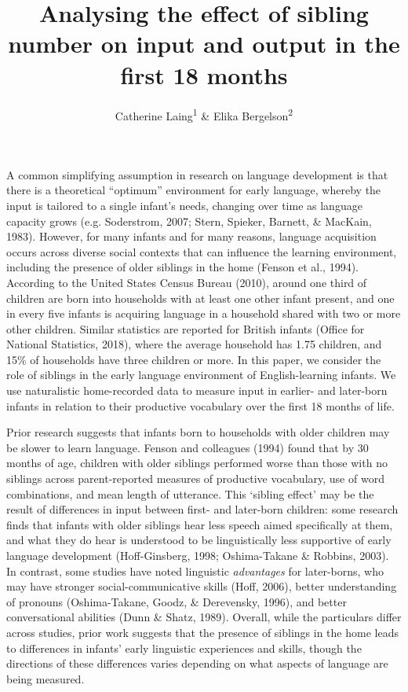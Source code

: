\documentclass[
  english,
  man,floatsintext]{apa6}
\title{Analysing the effect of sibling number on input and output in the first 18 months}
\author{Catherine Laing\textsuperscript{1} \& Elika Bergelson\textsuperscript{2}}
\date{}
\affiliation{\vspace{0.5cm}\textsuperscript{1} University of York, York, UK\\\textsuperscript{2} Duke University, Durham, NC, USA}
\begin{document}
\maketitle

A common simplifying assumption in research on language development is that there is a theoretical ``optimum'' environment for early language, whereby the input is tailored to a single infant's needs, changing over time as language capacity grows (e.g. Soderstrom, 2007; Stern, Spieker, Barnett, \& MacKain, 1983). However, for many infants and for many reasons, language acquisition occurs across diverse social contexts that can influence the learning environment, including the presence of older siblings in the home (Fenson et al., 1994). According to the United States Census Bureau (2010), around one third of children are born into households with at least one other infant present, and one in every five infants is acquiring language in a household shared with two or more other children. Similar statistics are reported for British infants (Office for National Statistics, 2018), where the average household has 1.75 children, and 15\% of households have three children or more. In this paper, we consider the role of siblings in the early language environment of English-learning infants. We use naturalistic home-recorded data to measure input in earlier- and later-born infants in relation to their productive vocabulary over the first 18 months of life.

Prior research suggests that infants born to households with older children may be slower to learn language. Fenson and colleagues (1994) found that by 30 months of age, children with older siblings performed worse than those with no siblings across parent-reported measures of productive vocabulary, use of word combinations, and mean length of utterance. This `sibling effect' may be the result of differences in input between first- and later-born children: some research finds that infants with older siblings hear less speech aimed specifically at them, and what they do hear is understood to be linguistically less supportive of early language development (Hoff-Ginsberg, 1998; Oshima-Takane \& Robbins, 2003). In contrast, some studies have noted linguistic \emph{advantages} for later-borns, who may have stronger social-communicative skills (Hoff, 2006), better understanding of pronouns (Oshima-Takane, Goodz, \& Derevensky, 1996), and better conversational abilities (Dunn \& Shatz, 1989). Overall, while the particulars differ across studies, prior work suggests that the presence of siblings in the home leads to differences in infants' early linguistic experiences and skills, though the directions of these differences varies depending on what aspects of language are being measured.
\end{document}
